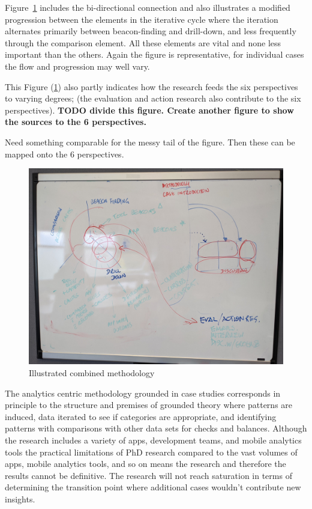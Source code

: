 Figure~\ref{fig:illustrated-combined-methodology} includes the bi-directional connection and also illustrates a modified progression between the elements in the iterative cycle where the iteration alternates primarily between beacon-finding and drill-down, and less frequently through the comparison element. All these elements are vital and none less important than the others. Again the figure is representative, for individual cases the flow and progression may well vary.

This Figure (\ref{fig:illustrated-combined-methodology}) also partly indicates how the research feeds the six perspectives to varying degrees; (the evaluation and action research also contribute to the six perspectives). 
\textbf{TODO divide this figure. Create another figure to show the sources to the 6 perspectives.}

Need something comparable for the messy tail of the figure. Then these can be mapped onto the 6 perspectives. 

\begin{figure}
    \centering
    \includegraphics[width=14cm]{images/my/illustrated-combined-methodology-v0-1.jpg}
    \caption{Illustrated combined methodology}
    \label{fig:illustrated-combined-methodology}
\end{figure}

The analytics centric methodology grounded in case studies corresponds in principle to the structure and premises of grounded theory where patterns are induced, data iterated to see if categories are appropriate, and identifying patterns with comparisons with other data sets for checks and balances. Although the research includes a variety of apps, development teams, and mobile analytics tools the practical limitations of PhD research compared to the vast volumes of apps, mobile analytics tools, and so on means the research and therefore the results cannot be definitive. The research will not reach saturation in terms of determining the transition point where additional cases wouldn't contribute new insights.

